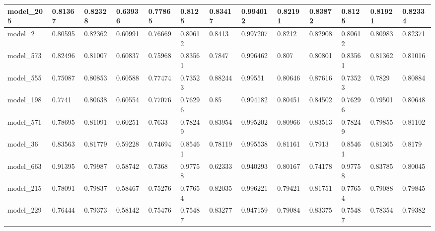 \begin{tabular}{|l|l|l|l|l|l|l|l|l|l|l|l|l|}
model\_205     & 0.81367     & 0.82328        & 0.63936      & 0.77865          & 0.8125               & 0.83417              & 0.994012     & 0.82191           & 0.83872            & 0.8125          & 0.81921     & 0.82334      \\ \hline
model\_2       & 0.80595     & 0.82362        & 0.60991      & 0.76669          & 0.80612              & 0.8413               & 0.997207     & 0.8212            & 0.82908            & 0.80612         & 0.80983     & 0.82371      \\ \hline
model\_573     & 0.82496     & 0.81007        & 0.60837      & 0.75968          & 0.83561              & 0.7847               & 0.996462     & 0.807             & 0.80801            & 0.83561         & 0.81362     & 0.81016      \\ \hline
model\_555     & 0.75087     & 0.80853        & 0.60588      & 0.77474          & 0.73523              & 0.88244              & 0.99551      & 0.80646           & 0.87616            & 0.73523         & 0.7829      & 0.80884      \\ \hline
model\_198     & 0.7741      & 0.80638        & 0.60554      & 0.77076          & 0.76296              & 0.85                 & 0.994182     & 0.80451           & 0.84502            & 0.76296         & 0.79501     & 0.80648      \\ \hline
model\_571     & 0.78695     & 0.81091        & 0.60251      & 0.7633           & 0.78249              & 0.83954              & 0.995202     & 0.80966           & 0.83513            & 0.78249         & 0.79855     & 0.81102      \\ \hline
model\_36      & 0.83563     & 0.81779        & 0.59228      & 0.74694          & 0.85461              & 0.78119              & 0.995538     & 0.81161           & 0.7913             & 0.85461         & 0.81365     & 0.8179       \\ \hline
model\_663     & 0.91395     & 0.79987        & 0.58742      & 0.7368           & 0.97758              & 0.62333              & 0.940293     & 0.80167           & 0.74178            & 0.97758         & 0.83785     & 0.80045      \\ \hline
model\_215     & 0.78091     & 0.79837        & 0.58467      & 0.75276          & 0.77654              & 0.82035              & 0.996221     & 0.79421           & 0.81751            & 0.77654         & 0.79088     & 0.79845      \\ \hline
model\_229     & 0.76444     & 0.79373        & 0.58142      & 0.75476          & 0.75487              & 0.83277              & 0.947159     & 0.79084           & 0.83375            & 0.75487         & 0.78354     & 0.79382      \\ \hline

\end{tabular}
